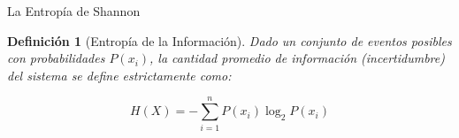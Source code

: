 \documentclass[10pt, aspectratio=169]{beamer}
\newtheorem{definicion}{Definición}
\begin{document}
\begin{frame}{La Entropía de Shannon}
    \vspace{0.4cm}
    
    \begin{definicion}[Entropía de la Información]
        Dado un conjunto de eventos posibles con probabilidades $P(x_i)$, la cantidad promedio de información (incertidumbre) del sistema se define estrictamente como:
        
        \vspace{0.2cm}
        \huge
        $$H(X) = - \sum_{i=1}^n P(x_i) \log_2 P(x_i)$$
    \end{definicion}
\end{frame}
\end{document}
